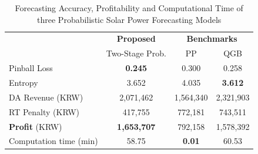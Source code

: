 \documentclass[journal]{IEEEtran} %
\begin{document}
\begin{table}[t!]
	\begin{center}
		\caption{Forecasting Accuracy, Profitability and Computational Time of three Probabilistic Solar Power Forecasting Models}
		\label{t8}
		\begin{tabular}{lccc}
		\toprule
			\toprule %
			   & \textbf{Proposed} & \multicolumn{2}{c}{\textbf{Benchmarks}} \\ \cmidrule{3-4}    
			   &Two-Stage Prob. & PP&QGB\\
			\midrule %
		    Pinball Loss &\textbf{0.245}& 0.300 & 0.258  \\
		    Entropy &3.652 & 4.035 & \textbf{3.612}\\
		    \midrule 
		    DA Revenue (KRW)  &2,071,462  &1,564,340 & 2,321,903 \\
		    RT Penalty (KRW) & 417,755 & 772,181& 743,511\\
		    \textbf{Profit} (KRW) &  \textbf{1,653,707} &  792,158& 1,578,392\\
			\midrule %
		    Computation time (min) &58.75& \textbf{0.01} & 60.53  \\
		    
		    
		    \bottomrule
			\bottomrule %
		\end{tabular}
	\end{center}
	\vspace{-0.2in}
\end{table}









\end{document}
